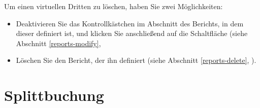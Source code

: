 Um einen virtuellen Dritten zu löschen, haben Sie zwei Möglichkeiten:
\begin{itemize}
	\item Deaktivieren Sie das Kontrollkästchen  im Abschnitt  des Berichts, in dem dieser definiert ist, und klicken Sie anschließend auf die Schaltfläche  (siehe Abschnitt \vref{reports-modify},
	\item Löschen Sie den Bericht, der ihn definiert (siehe Abschnitt \vref{reports-delete}, ).
\end{itemize}


\section{Splittbuchung\label{transactions-breakdown}}

